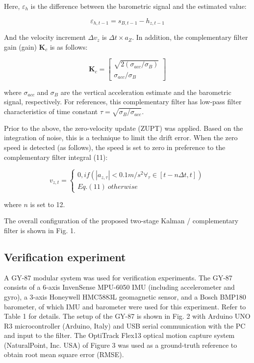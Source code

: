 \documentclass[10pt,journal,compsoc]{IEEEtran}
\begin{document}
Here, $\varepsilon_h$ is the difference between the barometric signal and the estimated value:

\[\varepsilon_{h,t-1} = s_{B,t-1} - h_{z,t-1}\tag{12}\]

And the velocity increment $\Delta v_z$ is $\Delta t \times a_Z$. In addition, the complementary filter gain (gain)
$\bm{K}_c$ is as follows:

\[\bm{K}_c = \begin{bmatrix}  \sqrt{2 (\sigma_{acc}/\sigma_B)} \\ \sigma_{acc}/\sigma_B \end{bmatrix} \tag{13}\]

\noindent where $\sigma_{acc}$ and $\sigma_B$ are the vertical acceleration estimate and the barometric signal,
respectively.   For references, this complementary filter has low-pass filter
characteristics of time constant $\tau = \sqrt{\sigma_B/\sigma_{acc}}$.

Prior to the above, the zero-velocity update (ZUPT) was applied.  Based
on the integration of noise, this is a technique to limit the drift error. When the
zero speed is detected (as follows), the speed is set to zero in preference to
the complementary filter integral (11):

\[v_{z,t} = \begin{cases} 0, if (|a_{z,\tau}|<0.1m/s^2 \forall_\tau\in[t-n\Delta t, t]) \\ Eq. (11)~otherwise \end{cases} \tag{14}\]

\noindent where $n$ is set to 12.

The overall configuration of the proposed two-stage Kalman / complementary filter is shown in Fig. 1.

\subsection{Verification experiment}

A GY-87 modular system was used for verification experiments. The GY-87
consists of a 6-axis InvenSense MPU-6050 IMU (including accelerometer and
gyro), a 3-axis Honeywell HMC5883L geomagnetic sensor, and a Bosch BMP180
barometer, of which IMU and barometer were used for this experiment. Refer to
Table 1 for details.  The setup of the GY-87 is shown in Fig. 2 with Arduino
UNO R3 microcontroller (Arduino, Italy) and USB serial communication with the
PC and input to the filter.  The OptiTrack Flex13 optical motion capture system
(NaturalPoint, Inc. USA) of Figure 3 was used as a ground-truth reference to obtain
root mean square error (RMSE).  
\end{document}
